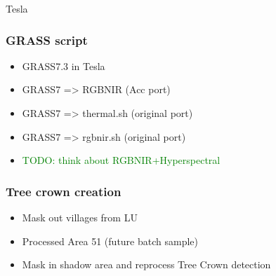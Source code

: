 \documentclass[serif,mathserif,aspectratio=169]{beamer}
\begin{document}

{
\begin{frame}[plain]
\begin{shaded}
\Huge Tesla
\end{shaded}
\end{frame}}


\begin{frame}
  \frametitle{GRASS script}
\begin{center}
\begin{itemize}
 \item GRASS7.3 in Tesla
 \item GRASS7 => RGBNIR (Acc port)
 \item GRASS7 => thermal.sh (original port)
 \item GRASS7 => rgbnir.sh (original port)
 \item \textcolor{green}{TODO: think about RGBNIR+Hyperspectral}
\end{itemize}
\end{center}
\end{frame}


\begin{frame}
  \frametitle{Tree crown creation}
\begin{center}
\begin{itemize}
 \item Mask out villages from LU
  \item Processed Area 51 (future batch sample)
 \item Mask in shadow area and reprocess Tree Crown detection
\end{itemize}
\end{center}
\end{frame}
\end{document}
